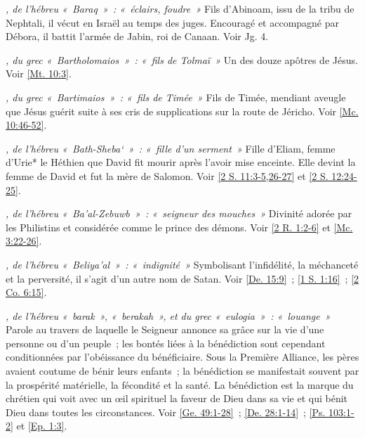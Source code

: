 \begin{multicols}{2}
\textit{, de l'hébreu «~Baraq~»~: «~éclairs, foudre~»}\newline
Fils d'Abinoam, issu de la tribu de Nephtali, il vécut en Israël au temps des juges. Encouragé et accompagné par Débora, il battit l'armée de Jabin, roi de Canaan. Voir Jg. 4.

\textit{, du grec «~Bartholomaios~»~: «~fils de Tolmaï~»}\newline
Un des douze apôtres de Jésus. Voir \vref{Mt. 10:3}.

\textit{, du grec «~Bartimaios~»~: «~fils de Timée~»}\newline
Fils de Timée, mendiant aveugle que Jésus guérit suite à ses cris de supplications sur la route de Jéricho. Voir \vref{Mc. 10:46-52}.

\textit{, de l'hébreu «~Bath-Sheba`~»~: «~fille d'un serment~»}\newline
Fille d'Eliam, femme d'Urie* le Héthien que David fit mourir après l'avoir mise enceinte. Elle devint la femme de David et fut la mère de Salomon. Voir \vref{2 S. 11:3-5,26-27} et \vref{2 S. 12:24-25}.

\textit{, de l'hébreu «~Ba'al-Zebuwb~»~: «~seigneur des mouches~»}\newline
Divinité adorée par les Philistins et considérée comme le prince des démons. Voir \vref{2 R. 1:2-6} et \vref{Mc. 3:22-26}.

\textit{, de l'hébreu «~Beliya'al~»~: «~indignité~»}\newline
Symbolisant l'infidélité, la méchanceté et la perversité, il s'agit d'un autre nom de Satan. Voir \vref{De. 15:9}~; \vref{1 S. 1:16}~; \vref{2 Co. 6:15}.

\textit{, de l'hébreu «~barak~», «~berakah~», et du grec «~eulogia~»~: «~louange~»}\newline
Parole au travers de laquelle le Seigneur annonce sa grâce sur la vie d'une personne ou d'un peuple~; les bontés liées à la bénédiction sont cependant conditionnées par l'obéissance du bénéficiaire. Sous la Première Alliance, les pères avaient coutume de bénir leurs enfants~; la bénédiction se manifestait souvent par la prospérité matérielle, la fécondité et la santé. La bénédiction est la marque du chrétien qui voit avec un œil spirituel la faveur de Dieu dans sa vie et qui bénit Dieu dans toutes les circonstances. Voir \vref{Ge. 49:1-28}~; \vref{De. 28:1-14}~; \vref{Ps. 103:1-2} et \vref{Ep. 1:3}.


\end{multicols}
